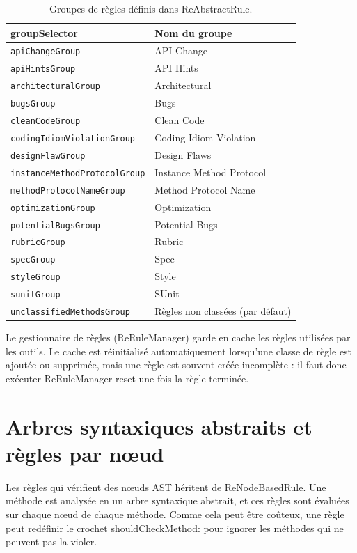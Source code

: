 \documentclass[11pt,a4paper]{report}
\begin{document}
\begin{table}[h]
\centering
\begin{tabular}{ll}
\toprule
groupSelector & Nom du groupe \\
\midrule
\texttt{apiChangeGroup} & API Change \\
\texttt{apiHintsGroup} & API Hints \\
\texttt{architecturalGroup} & Architectural \\
\texttt{bugsGroup} & Bugs \\
\texttt{cleanCodeGroup} & Clean Code \\
\texttt{codingIdiomViolationGroup} & Coding Idiom Violation \\
\texttt{designFlawGroup} & Design Flaws \\
\texttt{instanceMethodProtocolGroup} & Instance Method Protocol \\
\texttt{methodProtocolNameGroup} & Method Protocol Name \\
\texttt{optimizationGroup} & Optimization \\
\texttt{potentialBugsGroup} & Potential Bugs \\
\texttt{rubricGroup} & Rubric \\
\texttt{specGroup} & Spec \\
\texttt{styleGroup} & Style \\
\texttt{sunitGroup} & SUnit \\
\texttt{unclassifiedMethodsGroup} & Règles non classées (par défaut) \\
\bottomrule
\end{tabular}
\caption{Groupes de règles définis dans ReAbstractRule.}
\end{table}

Le gestionnaire de règles (ReRuleManager) garde en cache les règles utilisées par les outils. Le cache est réinitialisé automatiquement lorsqu’une classe de règle est ajoutée ou supprimée, mais une règle est souvent créée incomplète : il faut donc exécuter ReRuleManager reset une fois la règle terminée.

\section{Arbres syntaxiques abstraits et règles par nœud}
Les règles qui vérifient des nœuds AST héritent de ReNodeBasedRule. Une méthode est analysée en un arbre syntaxique abstrait, et ces règles sont évaluées sur chaque nœud de chaque méthode. Comme cela peut être coûteux, une règle peut redéfinir le crochet shouldCheckMethod: pour ignorer les méthodes qui ne peuvent pas la violer.
\end{document}
